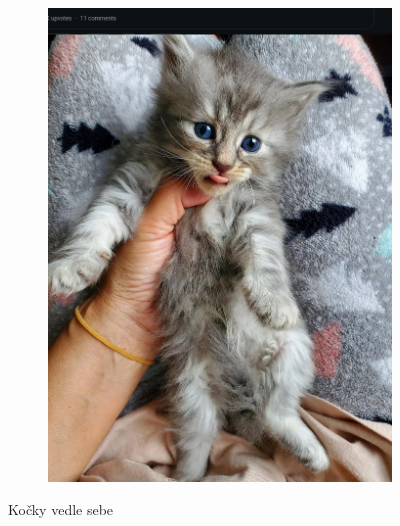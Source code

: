 \documentclass[]{article}
\begin{document}
\begin{figure}[H]
\centering
    \begin{subfigure}[b]{0.49\textwidth}
        \centering
        \caption{\label{fig:cato2} \cite{cato2}}
    \end{subfigure}
    \hfill
    \begin{subfigure}[b]{0.49\textwidth}
        \centering
        \includegraphics[width=\textwidth]{foto/ScreenshotIllegallySmolCats3.png}
        \caption{\label{fig:cato3} \cite{cato3}}
    \end{subfigure}

    \caption{\label{fig:catos} Kočky vedle sebe}
\end{figure}
\end{document}
